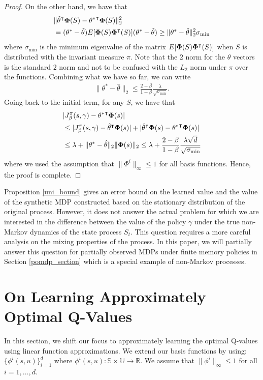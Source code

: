 \documentclass[11pt]{article}
\begin{document}
\begin{proof}
On the other hand, we have that 
\begin{align*}
&\| \hat{\theta}^\intercal {\bf \Phi}(S) -  {\theta^*}^\intercal {\bf \Phi}(S)\|^2_2\\
&= (\theta^* - \hat{\theta}) E[{\bf \Phi}(S) {\bf \Phi}^\intercal(S)  ] (\theta^*-\hat{\theta}) \geq  \|\theta^* - \hat{\theta}\|^2_2 \sigma_{\min}
\end{align*}
where $\sigma_{\min}$ is the minimum eigenvalue of the matrix $E[{\bf \Phi}(S) {\bf \Phi}^\intercal(S)  ] $ when $S$ is distributed with the invariant measure $\pi$. Note that the $2$ norm for the $\theta$ vectors is the standard $2$ norm and not to be confused with the $L_2$ norm under $\pi$ over the functions. Combining what we have so far, we can write
\begin{align*}
 \|\theta^* - \hat{\theta}\|_2 \leq \frac{2-\beta}{1-\beta}\frac{\lambda}{\sqrt{\sigma_{\min}}}.
\end{align*}
Going back to the initial term, for any $S$, we have that 
\begin{align*}
&|J_\beta^\pi(s,\gamma) - {\theta^*}^\intercal {\bf \Phi}(s)|\\
& \leq | J_\beta^\pi(s,\gamma) - \hat{\theta}^\intercal {\bf \Phi}(s)|+ | \hat{\theta}^\intercal {\bf \Phi}(s) -  {\theta^*}^\intercal {\bf \Phi}(s)|\\
&\leq \lambda +  \|\theta^* - \hat{\theta}\|_2  \| {\bf \Phi}(s)\|_2\leq \lambda +  \frac{2-\beta}{1-\beta}\frac{\lambda\sqrt{d}}{\sqrt{\sigma_{\min}}}
\end{align*}
where we used the assumption that $\|\Phi^i\|_\infty\leq 1$ for all basis functions. Hence, the proof is complete.
\end{proof}

Proposition \ref{uni_bound} gives an error bound on the learned value and the value of the synthetic MDP constructed based on the stationary distribution of the original process. However, it does not answer the actual problem for which we are interested in the difference between the  value of the policy $\gamma$ under the true non-Markov dynamics of the state process $S_t$. This question requires a more careful analysis on the mixing properties of the process. In this paper, we will partially answer this question for partially observed MDPs under finite memory policies in Section \ref{pomdp_section} which is a special example of non-Markov processes.


\section{On Learning Approximately Optimal Q-Values }\label{q_learn_sec}
In this section, we shift our focus to approximately learning the optimal Q-values using linear function approximations. 
We extend our basis functions by using: $\{\phi^i(s,u)\}_{i=1}^d$ where  $\phi^i(s,u):\mathds{S}\times\mathds{U}\to \mathds{R}$.
We assume that $
\|\phi^i\|_\infty\leq 1$
for all $i=1,\dots,d$.
\end{document}
